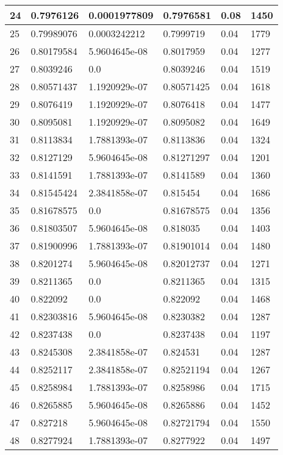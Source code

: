 \begin{longtable}{|l|l|l|l|l|l|}
24 & 0.7976126 & 0.0001977809 & 0.7976581 & 0.08 & 1450 \\ \hline 
25 & 0.79989076 & 0.0003242212 & 0.7999719 & 0.04 & 1779 \\ \hline 
26 & 0.80179584 & 5.9604645e-08 & 0.8017959 & 0.04 & 1277 \\ \hline 
27 & 0.8039246 & 0.0 & 0.8039246 & 0.04 & 1519 \\ \hline 
28 & 0.80571437 & 1.1920929e-07 & 0.80571425 & 0.04 & 1618 \\ \hline 
29 & 0.8076419 & 1.1920929e-07 & 0.8076418 & 0.04 & 1477 \\ \hline 
30 & 0.8095081 & 1.1920929e-07 & 0.8095082 & 0.04 & 1649 \\ \hline 
31 & 0.8113834 & 1.7881393e-07 & 0.8113836 & 0.04 & 1324 \\ \hline 
32 & 0.8127129 & 5.9604645e-08 & 0.81271297 & 0.04 & 1201 \\ \hline 
33 & 0.8141591 & 1.7881393e-07 & 0.8141589 & 0.04 & 1360 \\ \hline 
34 & 0.81545424 & 2.3841858e-07 & 0.815454 & 0.04 & 1686 \\ \hline 
35 & 0.81678575 & 0.0 & 0.81678575 & 0.04 & 1356 \\ \hline 
36 & 0.81803507 & 5.9604645e-08 & 0.818035 & 0.04 & 1403 \\ \hline 
37 & 0.81900996 & 1.7881393e-07 & 0.81901014 & 0.04 & 1480 \\ \hline 
38 & 0.8201274 & 5.9604645e-08 & 0.82012737 & 0.04 & 1271 \\ \hline 
39 & 0.8211365 & 0.0 & 0.8211365 & 0.04 & 1315 \\ \hline 
40 & 0.822092 & 0.0 & 0.822092 & 0.04 & 1468 \\ \hline 
41 & 0.82303816 & 5.9604645e-08 & 0.8230382 & 0.04 & 1287 \\ \hline 
42 & 0.8237438 & 0.0 & 0.8237438 & 0.04 & 1197 \\ \hline 
43 & 0.8245308 & 2.3841858e-07 & 0.824531 & 0.04 & 1287 \\ \hline 
44 & 0.8252117 & 2.3841858e-07 & 0.82521194 & 0.04 & 1267 \\ \hline 
45 & 0.8258984 & 1.7881393e-07 & 0.8258986 & 0.04 & 1715 \\ \hline 
46 & 0.8265885 & 5.9604645e-08 & 0.8265886 & 0.04 & 1452 \\ \hline 
47 & 0.827218 & 5.9604645e-08 & 0.82721794 & 0.04 & 1550 \\ \hline 
48 & 0.8277924 & 1.7881393e-07 & 0.8277922 & 0.04 & 1497 \\ \hline 

\end{longtable}
